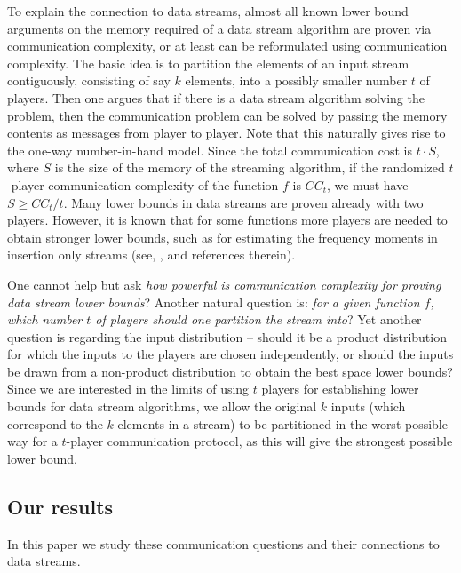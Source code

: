 To explain the connection to data streams, almost all known lower bound arguments on the memory required of a data stream algorithm are proven via communication complexity, or at least can be reformulated using communication complexity. 
The basic idea is to partition the elements of an input stream contiguously, consisting of say $k$ elements, into a possibly smaller number $t$ of players. 
Then one argues that if there is a data stream algorithm  solving the problem, then the communication problem can be solved by passing the memory contents as messages from player to player. 
Note that this naturally gives rise to the one-way number-in-hand model. 
Since the total communication cost is $t \cdot S$, where $S$ is the size of the memory of the streaming algorithm, if the randomized $t$-player communication complexity of the function $f$ is $CC_t$, we must have $S \geq CC_t/t$. 
Many lower bounds in data streams are proven already with two players.
However, it is known that for some functions more  players are needed to obtain stronger lower bounds, such as for estimating the frequency moments in insertion only streams (see, \eg,
 \cite{BarYossef:2004eya,wz12} and references therein). 

One cannot help but ask \emph{how powerful is communication complexity for proving data stream lower bounds}? Another natural question is: \emph{for a given function $f$, which number $t$ of players should one partition the stream into}? 
Yet another question is regarding the input distribution -- should it be a product distribution for which the inputs to the players are chosen independently, 
or should the inputs be drawn from a non-product distribution to obtain the best space lower bounds? 
Since we are interested in the limits of using $t$ players for establishing lower bounds for data stream algorithms, we allow the original $k$ inputs (which correspond to the $k$ elements in a stream) to be partitioned in the worst possible way for a $t$-player communication protocol, as this will give the strongest possible lower bound.

\subsection{Our results}
In this paper we study these communication questions and their connections to data streams.

